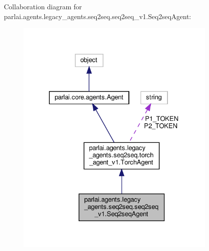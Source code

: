 Collaboration diagram for parlai.\+agents.\+legacy\+\_\+agents.\+seq2seq.\+seq2seq\+\_\+v1.\+Seq2seq\+Agent\+:
\nopagebreak
\begin{figure}[H]
\begin{center}
\leavevmode
\includegraphics[width=279pt]{dc/d76/classparlai_1_1agents_1_1legacy__agents_1_1seq2seq_1_1seq2seq__v1_1_1Seq2seqAgent__coll__graph}
\end{center}
\end{figure}
